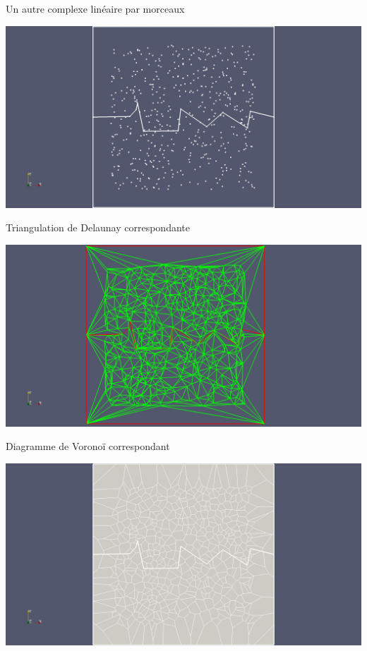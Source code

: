 \documentclass[aspectratio=169, 12pt, a4paper, hyperref={pdfauthor={Alexandre MARIN}, pdfkeywords={IFPEN, Delaunay, Voronoi, mesh generation}, colorlinks=true, linkcolor=purple, urlcolor=blue, citecolor=magenta}]{beamer}
\begin{document}
\begin{Energie}{\normalsize Un autre complexe linéaire par morceaux}
\begin{center}\vspace{-1cm}
\includegraphics[scale=0.18, viewport=500 0 1700 1300, clip]{plc.jpg}
\end{center}
\end{Energie}

\begin{Energie}{\normalsize Triangulation de Delaunay correspondante}
\begin{center}\vspace{-1cm}
\includegraphics[scale=0.18, viewport=480 0 1630 1300, clip]{interfaceInSquare.jpg}
\end{center}
\end{Energie}

\begin{Energie}{\normalsize Diagramme de Voronoï correspondant}
\begin{center}\vspace{-1cm}
\includegraphics[scale=0.18, viewport=500 0 1700 1300, clip]{extended_vor.jpg}
\end{center}
\end{Energie}
\end{document}
